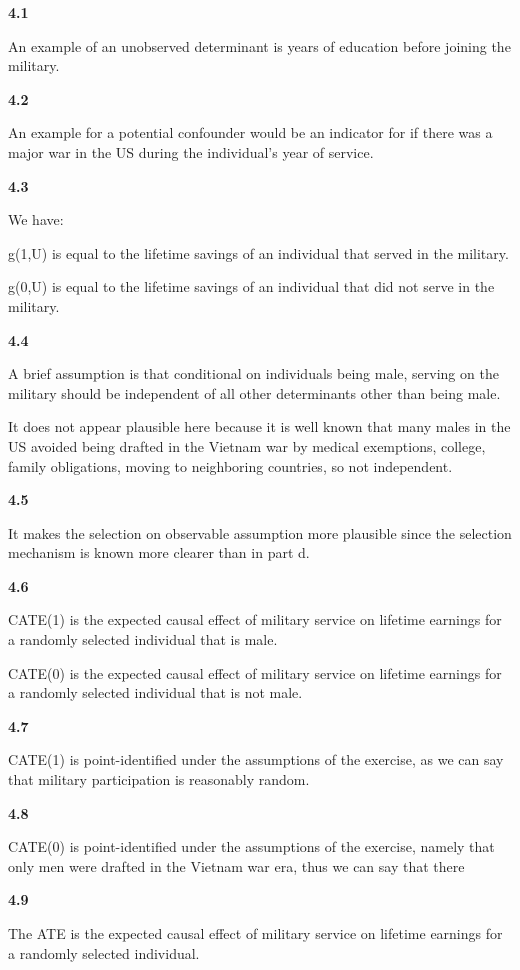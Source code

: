 \documentclass{article}
\begin{document}
\textbf{4.1}

An example of an unobserved determinant is years of education before joining the military.

\textbf{4.2}

An example for a potential confounder would be an indicator for if there was a major war in the US during the individual's year of service.

\textbf{4.3}

We have:

g(1,U) is equal to the lifetime savings of an individual that served in the military.

g(0,U) is equal to the lifetime savings of an individual that did not serve in the military.

\textbf{4.4}

A brief assumption is that conditional on individuals being male, serving on the military should be independent of all other determinants other than being male.

It does not appear plausible here because it is well known that many males in the US avoided being drafted in the Vietnam war by medical exemptions, college, family obligations, moving to neighboring countries, so not independent.

\textbf{4.5}

It makes the selection on observable assumption more plausible since the selection mechanism is known more clearer than in part d.

\textbf{4.6}

CATE(1) is the expected causal effect of military service on lifetime earnings for a randomly selected individual that is male.

CATE(0) is the expected causal effect of military service on lifetime earnings for a randomly selected individual that is not male.

\textbf{4.7}

CATE(1) is point-identified under the assumptions of the exercise, as we can say that military participation is reasonably random. 

\textbf{4.8}

CATE(0) is point-identified under the assumptions of the exercise, namely that only men were drafted in the Vietnam war era, thus we can say that there

\textbf{4.9}

The ATE is the expected causal effect of military service on lifetime earnings for a randomly selected individual.
\end{document}
